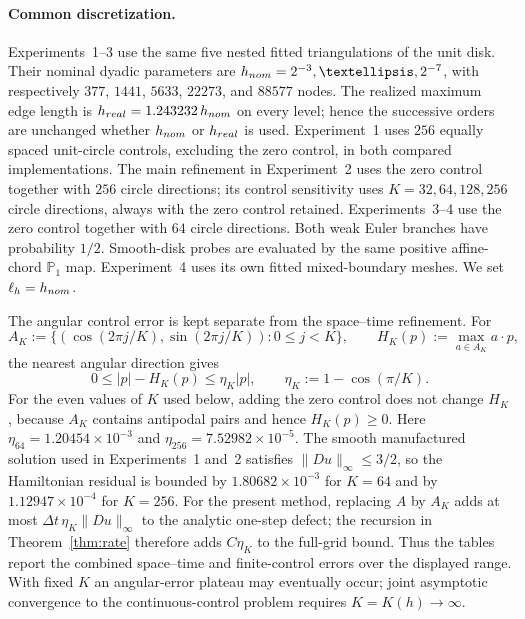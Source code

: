 \documentclass[10pt,a4paper]{amsart}
\begin{document}
\paragraph{Common discretization.}
Experiments~1--3 use the same five nested fitted triangulations of the unit
disk.  Their nominal dyadic parameters are
$h_{\rm nom}=2^{-3},\ldots,2^{-7}$, with respectively
$377$, $1441$, $5633$, $22273$, and $88577$ nodes.  The realized maximum edge
length is $h_{\rm real}=1.243232\,h_{\rm nom}$ on every level; hence the
successive orders are unchanged whether $h_{\rm nom}$ or $h_{\rm real}$ is
used.  Experiment~1 uses $256$ equally spaced unit-circle controls, excluding
the zero control, in both compared implementations.  The main refinement in
Experiment~2 uses the zero control together with $256$ circle directions; its
control sensitivity uses $K=32,64,128,256$ circle directions, always with the
zero control retained.  Experiments~3--4 use the zero control together with
$64$ circle directions.  Both weak Euler branches have probability $1/2$.
Smooth-disk probes are evaluated by the same positive affine-chord
$\mathbb P_1$ map.  Experiment~4 uses its own fitted mixed-boundary meshes.
We set $\ell_h=h_{\rm nom}$.

The angular control error is kept separate from the space--time refinement.
For
\[
 A_K:=\{(\cos(2\pi j/K),\sin(2\pi j/K)):0\le j<K\},
 \qquad H_K(p):=\max_{a\in A_K}a\cdot p,
\]
the nearest angular direction gives
\begin{equation}
 0\le |p|-H_K(p)
 \le \eta_K|p|,
 \qquad \eta_K:=1-\cos(\pi/K).
 \label{eq:angular-control-error}
\end{equation}
For the even values of $K$ used below, adding the zero control does not change
$H_K$, because $A_K$ contains antipodal pairs and hence $H_K(p)\ge0$.
Here $\eta_{64}=1.20454\times10^{-3}$ and
$\eta_{256}=7.52982\times10^{-5}$.  The smooth manufactured solution used in
Experiments~1 and~2 satisfies $\|Du\|_\infty\le3/2$, so the Hamiltonian
residual is bounded by
$1.80682\times10^{-3}$ for $K=64$ and by
$1.12947\times10^{-4}$ for $K=256$.
For the present method, replacing $A$ by $A_K$ adds at most
$\Delta t\,\eta_K\|Du\|_\infty$ to the analytic one-step defect; the recursion
in Theorem~\ref{thm:rate} therefore adds $C\eta_K$ to the full-grid bound.
Thus the tables report the combined space--time and finite-control errors over
the displayed range.  With fixed $K$ an angular-error plateau may eventually
occur; joint asymptotic convergence to the continuous-control problem
requires $K=K(h)\to\infty$.
\end{document}
